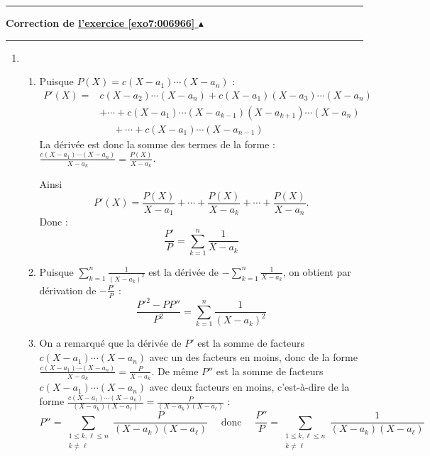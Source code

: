 \documentclass[11pt,a4paper]{article}
\renewcommand{\le}{\leqslant} \renewcommand{\leq}{\leqslant}
\newcounter{exo}
\newcommand{\correction}[1]{\hypertarget{cor7:#1}{}\label{cor7:#1}{\bf Correction de \hyperlink{exo7:#1}{l'exercice \ref{exo7:#1} $\blacktriangle$}}\vspace{1mm}\hrule\vspace{1mm}}
\newcommand{\fincorrection}{\vspace{1mm}\hrule\vspace*{7mm}}
\begin{document}
\fincorrection
\correction{006966}
\begin{enumerate}
\item 
  \begin{enumerate}
    \item Puisque $P(X)=c(X-a_1)\cdots(X-a_n)$ : 
\begin{eqnarray*}
P'(X)=&c(X-a_2)\cdots(X-a_n)+c(X-a_1)(X-a_3)\cdots(X-a_n)\\
 &+\cdots+c(X-a_1)\cdots(X-a_{k-1})(X-a_{k+1})\cdots(X-a_n)\\
 &\ \ \ \ \ \ +\cdots+c(X-a_1)\cdots(X-a_{n-1})
\end{eqnarray*}
La dérivée est donc la somme des termes de la forme : $\frac{c(X-a_1)\cdots(X-a_n)}{X-a_k} = \frac{P(X)}{X-a_k}$.

Ainsi 
$$P'(X) = \frac{P(X)}{X-a_1}+ \cdots + \frac{P(X)}{X-a_k}+ \cdots + \frac{P(X)}{X-a_n}.$$
Donc :
$$\frac{P'}{P}=\sum_{k=1}^n\frac{1}{X-a_k}$$

  \item Puisque $\sum_{k=1}^n\frac{1}{(X-a_k)^2}$ est la dérivée de $-\sum_{k=1}^n\frac{1}{X-a_k}$, on obtient
  par dérivation de $-\frac{P'}{P}$ :
$$\frac{P'^2-PP''}{P^2}=\sum_{k=1}^n\frac{1}{(X-a_k)^2}$$

  \item On a remarqué que la dérivée de $P'$ est la somme de facteurs $c(X-a_1)\cdots(X-a_n)$
avec un des facteurs en moins, donc de la forme $\frac{c(X-a_1)\cdots(X-a_n)}{X-a_k} = \frac{P}{X-a_k}$. 
De même $P''$ est la somme de facteurs $c(X-a_1)\cdots(X-a_n)$
avec deux facteurs en moins, c'est-à-dire de la forme $\frac{c(X-a_1)\cdots(X-a_n)}{(X-a_k)(X-a_\ell)} = \frac{P}{(X-a_k)(X-a_\ell)}$ :
$$P'' = \sum_{\substack{1\le k,\ell\le n \\ k\not= \ell}}\frac{P}{(X-a_k)(X-a_\ell)} \quad \text{ donc } \quad
\frac{P''}{P} = \sum_{\substack{1\le k,\ell\le n \\ k\not= \ell}}\frac{1}{(X-a_k)(X-a_\ell)}$$

  \end{enumerate}


\end{enumerate}
\end{document}
